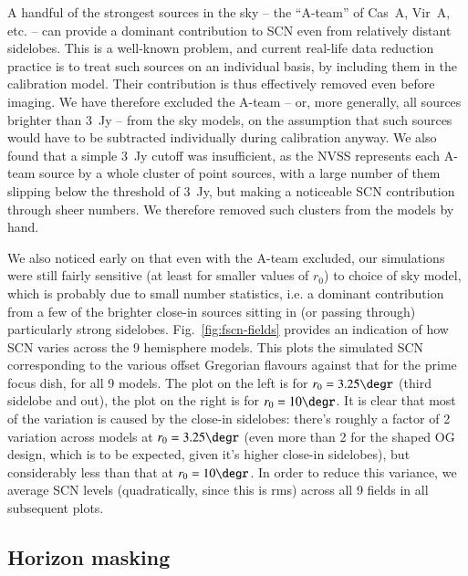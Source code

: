 \documentclass{aa}
\begin{document}
A handful of the strongest sources in the sky -- the ``A-team'' of  Cas~A, Vir~A, etc. -- can provide a dominant contribution to SCN even from relatively distant sidelobes. This is a well-known problem, and current real-life data reduction practice is to treat such sources on an individual basis, by including them in the calibration model. Their contribution is thus effectively removed even before imaging. We have therefore excluded the A-team -- or, more generally, all sources brighter than 3~Jy -- from the sky models, on the assumption that such sources would have to be subtracted individually during calibration anyway. We also found that a simple 3~Jy cutoff was insufficient, as the NVSS represents each A-team source by a whole cluster of point sources, with a large number of them slipping below the threshold of 3~Jy, but making a noticeable SCN contribution through sheer numbers. We therefore removed such clusters from the models by hand.

We also noticed early on that even with the A-team excluded, our simulations were still fairly sensitive (at least for smaller values of $r_0$) to choice of sky model, which is probably due to small number statistics, i.e. a dominant contribution from a few of the brighter close-in sources sitting in (or passing through) particularly strong sidelobes. Fig.~\ref{fig:fscn-fields} provides an indication of how SCN varies across the 9 hemisphere models. This plots the simulated SCN corresponding to the various offset Gregorian flavours against that for the prime focus dish, for all 9 models. The plot on the left is for $r_0=3.25\degr$ (third sidelobe and out), the plot on the right is for $r_0=10\degr$. It is clear that most of the variation is caused by the close-in sidelobes: there's roughly a factor of 2 variation across models at $r_0=3.25\degr$ (even more than 2 for the shaped OG design, which is to be expected, given it's higher close-in sidelobes), but considerably less than that at $r_0=10\degr$. In 
order to reduce this variance, we average SCN levels (quadratically, since this is rms) across all 9 fields in all subsequent plots.

\subsection{Horizon masking}
\label{sec:horizon-masking}
\end{document}
